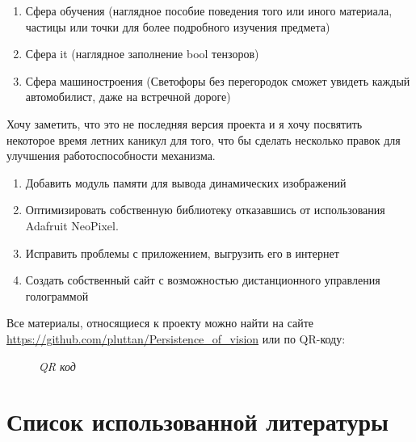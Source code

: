 \documentclass[a4paper, 12pt]{article}
\renewcommand{\href}[1]{\url{#1}}
\newcommand{\image}[3]{
	\begin{figure}[ht]
		\center{\texttt{[image: img/\#1]} }
		\caption{\textit{#3}}\end{figure}
}
\begin{document}
\begin{enumerate}
  \item Сфера обучения (наглядное пособие поведения того или иного
        материала, частицы или точки для более подробного изучения
        предмета)
  \item Сфера it (наглядное заполнение bool тензоров)
  \item Сфера машиностроения (Светофоры без перегородок сможет
        увидеть каждый автомобилист, даже на встречной дороге)
\end{enumerate}

Хочу заметить, что это не последняя версия проекта
и я хочу посвятить некоторое время летних каникул для того, что бы
сделать несколько правок для улучшения работоспособности механизма.

\begin{enumerate}
  \item Добавить модуль памяти для вывода динамических изображений
  \item Оптимизировать собственную библиотеку отказавшись от
        использования Adafruit NeoPixel.
  \item Исправить проблемы с приложением, выгрузить его в интернет
  \item Создать собственный сайт с возможностью дистанционного
        управления голограммой
\end{enumerate}
Все материалы, относящиеся к проекту можно найти на сайте
\href{https://github.com/pluttan/Persistence_of_vision} или по
QR-коду:
\image{qr-code.png}{200}{QR код}
\newpage
\ttfamily
\section{Список использованной литературы}
\end{document}
